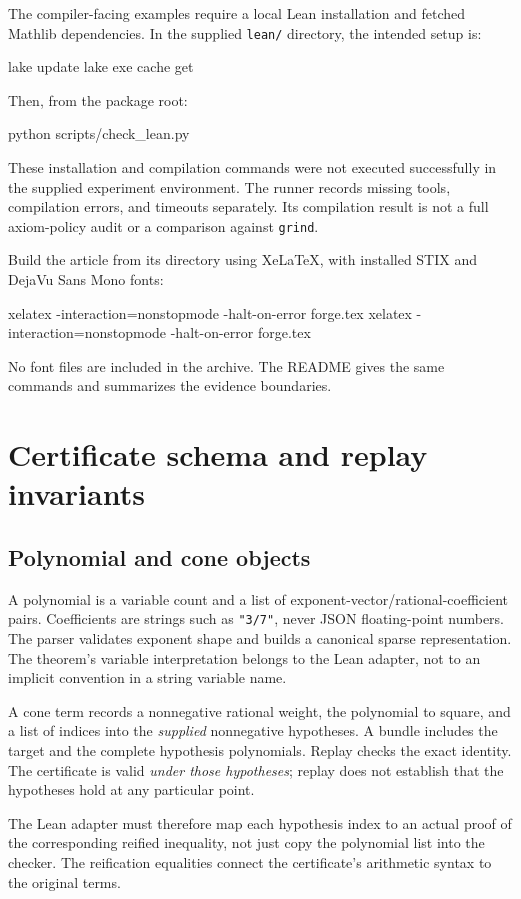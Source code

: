 \documentclass[11pt,letterpaper]{article}
\newcommand{\Lean}{\textsf{Lean}}
\newcommand{\grind}{\texttt{grind}}
\theoremstyle{definition}
\theoremstyle{remark}
\begin{document}
The compiler-facing examples require a local \Lean{} installation and fetched Mathlib dependencies. In the supplied \texttt{lean/} directory, the intended setup is:
\begin{code}
lake update
lake exe cache get
\end{code}
Then, from the package root:
\begin{code}
python scripts/check_lean.py
\end{code}
These installation and compilation commands were not executed successfully in the supplied experiment environment. The runner records missing tools, compilation errors, and timeouts separately. Its compilation result is not a full axiom-policy audit or a comparison against \grind{}.

Build the article from its directory using XeLaTeX, with installed STIX and DejaVu Sans Mono fonts:
\begin{code}
xelatex -interaction=nonstopmode -halt-on-error forge.tex
xelatex -interaction=nonstopmode -halt-on-error forge.tex
\end{code}
No font files are included in the archive. The README gives the same commands and summarizes the evidence boundaries.

\section{Certificate schema and replay invariants}
\subsection{Polynomial and cone objects}
A polynomial is a variable count and a list of exponent-vector/rational-coefficient pairs. Coefficients are strings such as \texttt{"3/7"}, never JSON floating-point numbers. The parser validates exponent shape and builds a canonical sparse representation. The theorem's variable interpretation belongs to the \Lean{} adapter, not to an implicit convention in a string variable name.

A cone term records a nonnegative rational weight, the polynomial to square, and a list of indices into the \emph{supplied} nonnegative hypotheses. A bundle includes the target and the complete hypothesis polynomials. Replay checks the exact identity. The certificate is valid \emph{under those hypotheses}; replay does not establish that the hypotheses hold at any particular point.

The \Lean{} adapter must therefore map each hypothesis index to an actual proof of the corresponding reified inequality, not just copy the polynomial list into the checker. The reification equalities connect the certificate's arithmetic syntax to the original terms.
\end{document}
